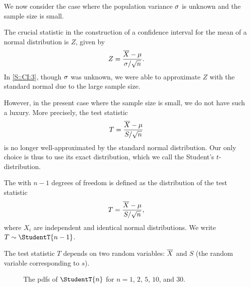 We now consider the case where the population variance $\sigma$ is unknown and the sample size is small.

The crucial statistic in the construction of a confidence interval for the mean of a normal distribution is $Z$, given by \[Z = \frac{\overline{X} - \mu}{\sigma/\sqrt{n}}.\] In \SS\ref{S::CI:3}, though $\sigma$ was unknown, we were able to approximate $Z$ with the standard normal due to the large sample size.

However, in the present case where the sample size is small, we do not have such a luxury. More precisely, the test statistic \[T = \frac{\overline{X} - \mu}{S / \sqrt{n}}\] is no longer well-approximated by the standard normal distribution. Our only choice is thus to use its exact distribution, which we call the Student's $t$-distribution.

\begin{definition}
    The  with $n-1$ degrees of freedom is defined as the distribution of the test statistic \[T = \frac{\overline{X} - \mu}{S / \sqrt{n}},\] where $X_i$ are independent and identical normal distributions. We write $T \sim \StudentT{n - 1}$.
\end{definition}

The test statistic $T$ depends on two random variables: $\overline{X}$ and $S$ (the random variable corresponding to $s$).

\begin{figure}[H]
    \centering
    \caption{The pdfs of $\StudentT{n}$ for $n = 1$, $2$, $5$, $10$, and $30$.}
\end{figure}

